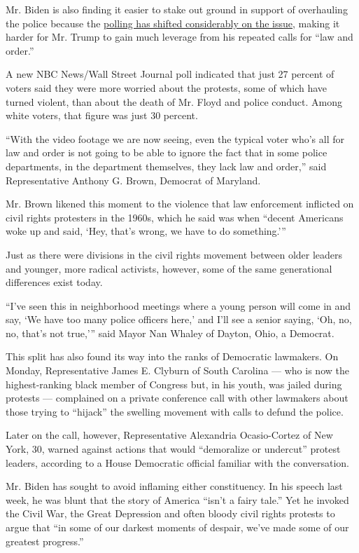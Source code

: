 Mr. Biden is also finding it easier to stake out ground in support of
overhauling the police because the
\href{https://www.nytimes3xbfgragh.onion/2020/06/05/us/politics/polling-george-floyd-protests-racism.html}{polling
has shifted considerably on the issue}, making it harder for Mr. Trump
to gain much leverage from his repeated calls for ``law and order.''

A new NBC News/Wall Street Journal poll indicated that just 27 percent
of voters said they were more worried about the protests, some of which
have turned violent, than about the death of Mr. Floyd and police
conduct. Among white voters, that figure was just 30 percent.

``With the video footage we are now seeing, even the typical voter who's
all for law and order is not going to be able to ignore the fact that in
some police departments, in the department themselves, they lack law and
order,'' said Representative Anthony G. Brown, Democrat of Maryland.

Mr. Brown likened this moment to the violence that law enforcement
inflicted on civil rights protesters in the 1960s, which he said was
when ``decent Americans woke up and said, `Hey, that's wrong, we have to
do something.'''

Just as there were divisions in the civil rights movement between older
leaders and younger, more radical activists, however, some of the same
generational differences exist today.

``I've seen this in neighborhood meetings where a young person will come
in and say, `We have too many police officers here,' and I'll see a
senior saying, `Oh, no, no, that's not true,''' said Mayor Nan Whaley of
Dayton, Ohio, a Democrat.

This split has also found its way into the ranks of Democratic
lawmakers. On Monday, Representative James E. Clyburn of South Carolina
--- who is now the highest-ranking black member of Congress but, in his
youth, was jailed during protests --- complained on a private conference
call with other lawmakers about those trying to ``hijack'' the swelling
movement with calls to defund the police.

Later on the call, however, Representative Alexandria Ocasio-Cortez of
New York, 30, warned against actions that would ``demoralize or
undercut'' protest leaders, according to a House Democratic official
familiar with the conversation.

Mr. Biden has sought to avoid inflaming either constituency. In his
speech last week, he was blunt that the story of America ``isn't a fairy
tale.'' Yet he invoked the Civil War, the Great Depression and often
bloody civil rights protests to argue that ``in some of our darkest
moments of despair, we've made some of our greatest progress.''

